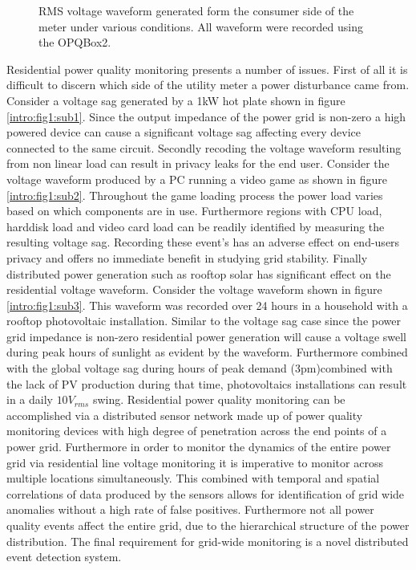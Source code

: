 \begin{figure}[h]
	\caption{RMS voltage waveform generated form the consumer side of the meter under various conditions. All waveform were recorded using the OPQBox2.}
	\label{intro:fig:1}
\end{figure}

Residential power quality monitoring presents a number of issues. First of all it is difficult to discern which side of the utility meter a power disturbance came from. Consider a voltage sag generated by a 1kW hot plate shown in figure \ref{intro:fig1:sub1}.  Since the output impedance of the power grid is non-zero a high powered device can cause a significant voltage sag affecting every device connected to the same circuit. Secondly recoding the voltage waveform resulting from non linear load can result in privacy leaks for the end user. Consider the voltage waveform produced by a PC running a video game as shown in figure \ref{intro:fig1:sub2}. Throughout the game loading process the power load varies based on which components are in use. Furthermore regions with CPU load, harddisk load and video card load can be readily identified by measuring the resulting voltage sag. Recording these event's has an adverse effect on end-users privacy and offers no immediate benefit in studying grid stability. Finally distributed power generation such as rooftop solar has significant effect on the residential voltage waveform. Consider the voltage waveform shown in figure \ref{intro:fig1:sub3}. This waveform was recorded over 24 hours in a household with a rooftop photovoltaic installation. Similar to the voltage sag case since the power grid impedance is non-zero residential power generation will cause a voltage swell during peak hours of sunlight as evident by the waveform. Furthermore combined with the global voltage sag during hours of peak demand (3pm)combined with the lack of PV production during that time, photovoltaics installations can result in a daily $10V_{rms}$ swing. Residential power quality monitoring can be accomplished via a distributed sensor network made up of power quality monitoring devices with high degree of penetration across the end points of a power grid. Furthermore in order to monitor the dynamics of the entire power grid via residential line voltage monitoring it is imperative to monitor across multiple locations simultaneously. This combined with temporal and spatial correlations of data produced by the sensors allows for identification of grid wide anomalies without a high rate of false positives. Furthermore not all power quality events affect the entire grid, due to the hierarchical structure of the power distribution. The final requirement for grid-wide monitoring is a novel distributed event detection system.

